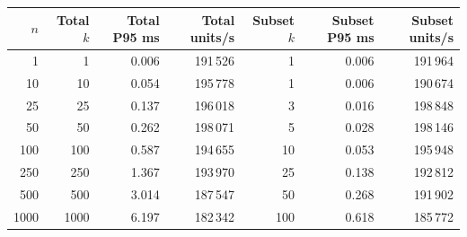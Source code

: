 \begin{tabular}{@{}rrrrrrr@{}}
\toprule
$n$ & Total $k$ & Total P95 ms & Total units/s & Subset $k$ & Subset P95 ms & Subset units/s \\
\midrule
1 & 1 & 0.006 & 191\,526 & 1 & 0.006 & 191\,964 \\
10 & 10 & 0.054 & 195\,778 & 1 & 0.006 & 190\,674 \\
25 & 25 & 0.137 & 196\,018 & 3 & 0.016 & 198\,848 \\
50 & 50 & 0.262 & 198\,071 & 5 & 0.028 & 198\,146 \\
100 & 100 & 0.587 & 194\,655 & 10 & 0.053 & 195\,948 \\
250 & 250 & 1.367 & 193\,970 & 25 & 0.138 & 192\,812 \\
500 & 500 & 3.014 & 187\,547 & 50 & 0.268 & 191\,902 \\
1000 & 1000 & 6.197 & 182\,342 & 100 & 0.618 & 185\,772 \\
\bottomrule
\end{tabular}
